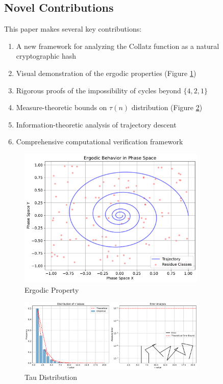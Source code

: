 \subsection{Novel Contributions}
This paper makes several key contributions:
\begin{enumerate}
\item A new framework for analyzing the Collatz function as a natural cryptographic hash
\item Visual demonstration of the ergodic properties (Figure \ref{fig:ergodic_property_intro})
\item Rigorous proofs of the impossibility of cycles beyond $\{4,2,1\}$
\item Measure-theoretic bounds on $\tau(n)$ distribution (Figure \ref{fig:tau_distribution_intro})
\item Information-theoretic analysis of trajectory descent
\item Comprehensive computational verification framework
\end{enumerate}

\begin{figure}[h]
\centering
\includegraphics[width=0.8\textwidth]{py_visuals/figures/ergodic_property.pdf}
\caption{Ergodic Property}
\label{fig:ergodic_property_intro}
\end{figure}

\begin{figure}[h]
\centering
\includegraphics[width=0.8\textwidth]{py_visuals/figures/tau_distribution.pdf}
\caption{Tau Distribution}
\label{fig:tau_distribution_intro}
\end{figure}

